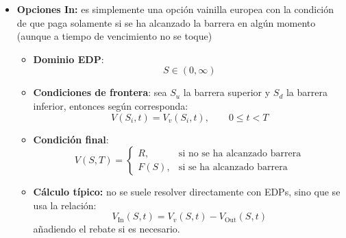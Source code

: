 \begin{itemize}
    \item \textbf{Opciones In:} es simplemente una opción vainilla europea con la condición de que paga solamente si se ha alcanzado la barrera en algún momento (aunque a tiempo de vencimiento no se toque)
    \begin{itemize}
        \item \textbf{Dominio EDP}:
            \[
                \boxed{S\in(0, \infty)}
            \]
        \item \textbf{Condiciones de frontera}: sea $S_u$ la barrera superior y $S_d$ la barrera inferior, entonces según corresponda:
            \[
                    \boxed{V(S_i,t) = V_v(S_i,t), \qquad 0 \leq t < T}
            \]
        \item \textbf{Condición final}:
            \[
                \boxed{
                    V(S,T) = 
                    \begin{cases} 
                        R, & \text{si no se ha alcanzado barrera} \\
                        F(S), & \text{si se ha alcanzado barrera}
                    \end{cases}
                }
            \]
        \item \textbf{Cálculo típico:} no se suele resolver directamente con EDPs, sino que se usa la relación:
        \[
            \boxed{V_{\text{In}}(S,t) = V_v(S,t) - V_{\text{Out}}(S,t)}
        \]
        añadiendo el rebate si es necesario.
    \end{itemize}
\end{itemize}




